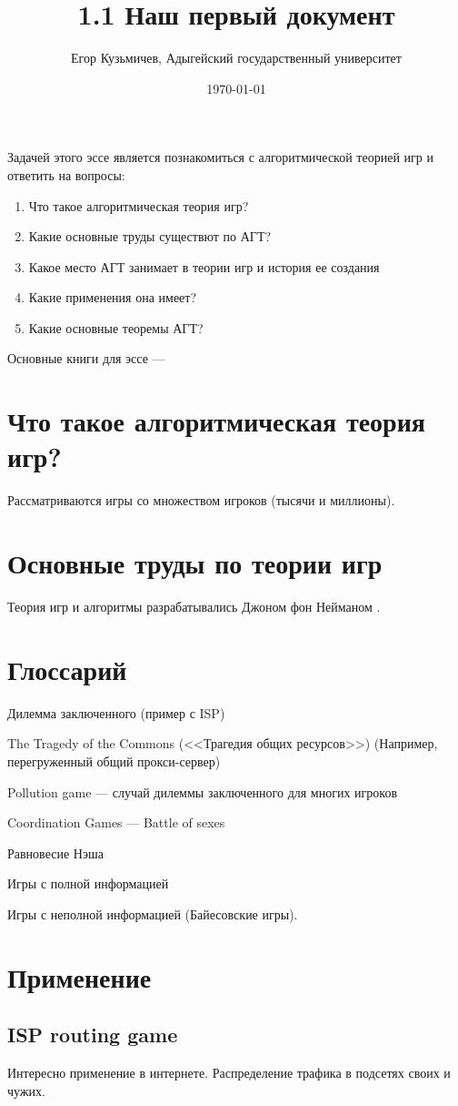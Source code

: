 \documentclass[a4paper,12pt]{article}
\author{Егор Кузьмичев, Адыгейский государственный университет}
\title{1.1 Наш первый документ}
\date{\today}
\begin{document}

\maketitle

Задачей этого эссе является познакомиться с алгоритмической теорией игр и ответить на вопросы:
\begin{enumerate}
\item Что такое алгоритмическая теория игр?
\item Какие основные труды существют по АГТ?
\item Какое место АГТ занимает в теории игр и история ее создания
\item Какие применения она имеет?
\item Какие основные теоремы АГТ?
\end{enumerate}

Основные книги для эссе --- \cite{agt}


\section{Что такое алгоритмическая теория игр?}

Рассматриваются игры со множеством игроков (тысячи и миллионы). 

\section{Основные труды по теории игр}
Теория игр и алгоритмы разрабатывались Джоном фон Нейманом \cite{neumann}.

\section{Глоссарий}

Дилемма заключенного (пример с ISP)

The Tragedy of the Commons (<<Трагедия общих ресурсов>>)
(Например, перегруженный общий прокси-сервер)

Pollution game --- случай дилеммы заключенного для многих игроков

Coordination Games
--- Battle of sexes

Равновесие Нэша

Игры с полной информацией

Игры с неполной информацией (Байесовские игры).


\section{Применение}
\subsection{ISP routing game}
Интересно применение в интернете. Распределение трафика в подсетях своих и чужих.

\medskip


\end{document}
